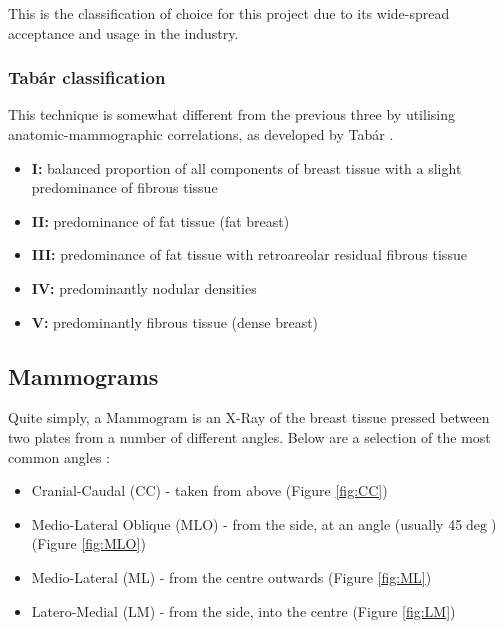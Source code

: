 This is the classification of choice for this project due to its wide-spread acceptance and usage in the industry.

\vspace{1cm}
\subsubsection{Tab\'ar classification}

This technique is somewhat different from the previous three by utilising anatomic-mammographic correlations, as developed by Tab\'ar \cite{al}.

\begin{itemize}
  \item \textbf{I: } balanced proportion of all components of breast tissue with a slight predominance of fibrous tissue
  \item \textbf{II: } predominance of fat tissue (fat breast)
  \item \textbf{III: } predominance of fat tissue with retroareolar residual fibrous tissue
  \item \textbf{IV: } predominantly nodular densities
  \item \textbf{V: } predominantly fibrous tissue (dense breast)
\end{itemize}

\subsection{Mammograms}

Quite simply, a Mammogram is an X-Ray of the breast tissue pressed between two plates from a number of different angles. Below are a selection of the most common angles \cite{Radswiki} \cite{Mammography_views_Doc_2016}:
\begin{itemize}
  \item Cranial-Caudal (CC) - taken from above (Figure \ref{fig:CC})
  \item Medio-Lateral Oblique (MLO) - from the side, at an angle (usually 45$\deg$) (Figure \ref{fig:MLO})
  \item Medio-Lateral (ML) - from the centre outwards (Figure \ref{fig:ML})
  \item Latero-Medial (LM) - from the side, into the centre (Figure \ref{fig:LM})
\end{itemize}

